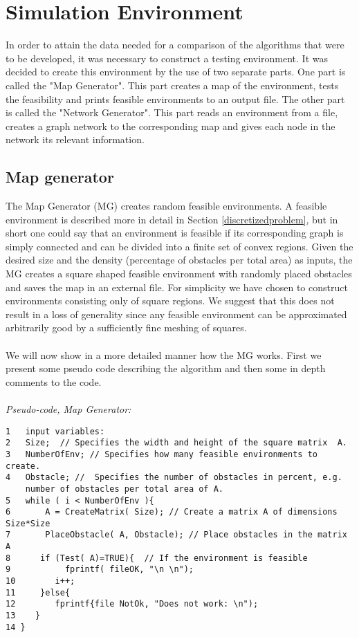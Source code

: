 \chapter{Simulation Environment}
In order to attain the data needed for a comparison of the algorithms that were to be developed, it was necessary to construct a testing environment. It was decided to create this environment by the use of two separate parts. One part is called the "Map Generator". This part creates a map of the environment, tests the feasibility and prints feasible environments to an output file. The other part is called the "Network Generator". This part reads an environment from a file, creates a graph network to the corresponding map and gives each node in the network its relevant information.
%
\section{Map generator}
The Map Generator (MG) creates random feasible environments. A feasible environment is described more in detail in Section \ref{discretizedproblem}, but in short one could say that an environment is feasible if its corresponding graph is simply connected and can be divided into a finite set of convex regions. Given the desired size and the density (percentage of obstacles per total area) as inputs, the MG creates a square shaped feasible environment with randomly placed obstacles and saves the map in an external file. For simplicity we have chosen to construct environments consisting only of square regions. %
We suggest that this does not result in a loss of generality since any feasible environment can be approximated arbitrarily good by a sufficiently fine meshing of squares. \\ %
\\We will now show in a more detailed manner how the MG works. First we present some pseudo code describing the algorithm and then some in depth comments to the code.\\
\\\noindent\emph{Pseudo-code, Map Generator:}
\begin{verbatim}
1   input variables:
2   Size;  // Specifies the width and height of the square matrix  A.
3   NumberOfEnv; // Specifies how many feasible environments to create.
4   Obstacle; //  Specifies the number of obstacles in percent, e.g. 
    number of obstacles per total area of A.
5   while ( i < NumberOfEnv ){
6       A = CreateMatrix( Size); // Create a matrix A of dimensions Size*Size
7       PlaceObstacle( A, Obstacle); // Place obstacles in the matrix A
8      if (Test( A)=TRUE){  // If the environment is feasible
9           fprintf( fileOK, "\n \n");
10        i++;
11     }else{
12        fprintf{file NotOk, "Does not work: \n");
13    }
14 }
\end{verbatim}
